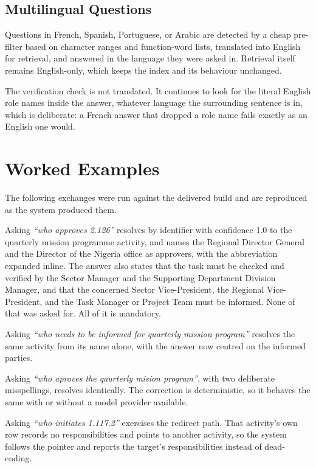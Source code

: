\subsection{Multilingual Questions}

Questions in French, Spanish, Portuguese, or Arabic are detected by a cheap pre-filter based on character ranges and function-word lists, translated into English for retrieval, and answered in the language they were asked in. Retrieval itself remains English-only, which keeps the index and its behaviour unchanged.

The verification check is not translated. It continues to look for the literal English role names inside the answer, whatever language the surrounding sentence is in, which is deliberate: a French answer that dropped a role name fails exactly as an English one would.

\section{Worked Examples}

The following exchanges were run against the delivered build and are reproduced as the system produced them.

Asking \textit{``who approves 2.126''} resolves by identifier with confidence 1.0 to the quarterly mission programme activity, and names the Regional Director General and the Director of the Nigeria office as approvers, with the abbreviation expanded inline. The answer also states that the task must be checked and verified by the Sector Manager and the Supporting Department Division Manager, and that the concerned Sector Vice-President, the Regional Vice-President, and the Task Manager or Project Team must be informed. None of that was asked for. All of it is mandatory.

Asking \textit{``who needs to be informed for quarterly mission program''} resolves the same activity from its name alone, with the answer now centred on the informed parties.

Asking \textit{``who aproves the qaurterly mision program''}, with two deliberate misspellings, resolves identically. The correction is deterministic, so it behaves the same with or without a model provider available.

Asking \textit{``who initiates 1.117.2''} exercises the redirect path. That activity's own row records no responsibilities and points to another activity, so the system follows the pointer and reports the target's responsibilities instead of dead-ending.

